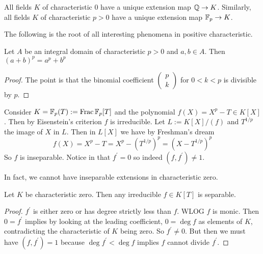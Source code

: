 \documentclass{article}
\begin{document}
\begin{eg}
  All fields $K$ of characteristic 0 have a unique 
  extension map $\mathbb{Q} \to K$.
  Similarly, all fields $K$ of characteristic $p > 0$
  have a unique extension map $\mathbb{F}_p \to K$.
\end{eg}

The following is the root of all interesting phenomena
in positive characteristic.

\begin{prop}
  
  Let $A$ be an integral domain of characteristic $p > 0$
  and $a , b \in A$.
  Then $(a + b)^p = a^p + b^p$
\end{prop}
\begin{proof}
  The point is that the binomial coefficient 
  $\begin{pmatrix}
    p \\ k
  \end{pmatrix}$
  for $0 < k < p$ is divisible by $p$.
\end{proof}

\begin{eg}
  Consider $K = \mathbb{F}_p(T) := \mathrm{Frac}\,\mathbb{F}_p[T]$
  and the polynomial $f(X) = X^p - T \in K[X]$.
  Then by Eisenstein's criterion $f$ is irreducible.
  Let $L := K[X] / (f)$ and $T^{1 / p}$ the image of $X$ in $L$.
  Then in $L[X]$ we have by Freshman's dream \[
    f(X) = X^p - T = X^p - (T^{1 / p})^p
    = (X - T^{1 / p})^p
  \]
  So $f$ is inseparable.
  Notice in that $f^\prime = 0$ so indeed $(f , f^\prime) \neq 1$.
\end{eg}

In fact, we cannot have inseparable extensions in characteristic zero.

\begin{prop}
  Let $K$ be characteristic zero.
  Then any irreducible $f \in K[T]$ is separable.
\end{prop}
\begin{proof}
  $f^\prime$ is either zero or has degree strictly less than $f$.
  WLOG $f$ is monic.
  Then $0 = f^\prime$ implies by looking at the leading coefficient,
  $0 = \deg f$ as elements of $K$,
  contradicting the characteristic of $K$ being zero.
  So $f^\prime \neq 0$.
  But then we must have $(f , f^\prime) = 1$ because
  $\deg f^\prime < \deg f$ implies $f$ cannot divide $f^\prime$.
\end{proof}

  
\end{document}
